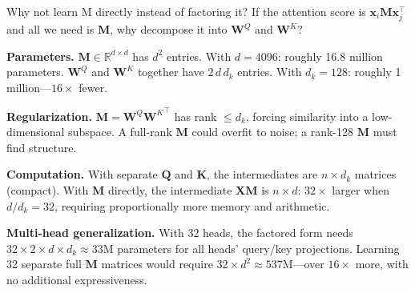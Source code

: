 \begin{whynotbox}{Why not learn M directly instead of factoring it?}
If the attention score is $\mathbf{x}_i \mathbf{M} \mathbf{x}_j^\top$ and all we need is $\mathbf{M}$, why decompose it into $\mathbf{W}^Q$ and $\mathbf{W}^K$?

\textbf{Parameters.} $\mathbf{M} \in \mathbb{R}^{d \times d}$ has $d^2$ entries. With $d = 4096$: roughly 16.8 million parameters. $\mathbf{W}^Q$ and $\mathbf{W}^K$ together have $2\,d\,d_k$ entries. With $d_k = 128$: roughly 1 million---$16\times$ fewer.

\textbf{Regularization.} $\mathbf{M} = \mathbf{W}^Q {\mathbf{W}^K}^\top$ has rank $\leq d_k$, forcing similarity into a low-dimensional subspace. A full-rank $\mathbf{M}$ could overfit to noise; a rank-128 $\mathbf{M}$ must find structure.

\textbf{Computation.} With separate $\mathbf{Q}$ and $\mathbf{K}$, the intermediates are $n \times d_k$ matrices (compact). With $\mathbf{M}$ directly, the intermediate $\mathbf{X}\mathbf{M}$ is $n \times d$: $32\times$ larger when $d/d_k = 32$, requiring proportionally more memory and arithmetic.

\textbf{Multi-head generalization.} With 32 heads, the factored form needs $32 \times 2 \times d \times d_k \approx 33$M parameters for all heads' query/key projections. Learning 32 separate full $\mathbf{M}$ matrices would require $32 \times d^2 \approx 537$M---over $16\times$ more, with no additional expressiveness.
\end{whynotbox}

